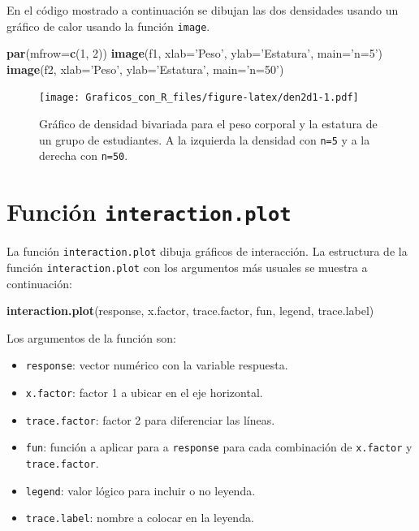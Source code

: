 \documentclass[10pt,]{krantz}
\makeatletter
\newenvironment{Shaded}{\begin{snugshade}}{\end{snugshade}}
\newcommand{\KeywordTok}[1]{\textcolor[rgb]{0.13,0.29,0.53}{\textbf{#1}}}
\newcommand{\DataTypeTok}[1]{\textcolor[rgb]{0.13,0.29,0.53}{#1}}
\newcommand{\DecValTok}[1]{\textcolor[rgb]{0.00,0.00,0.81}{#1}}
\newcommand{\StringTok}[1]{\textcolor[rgb]{0.31,0.60,0.02}{#1}}
\newcommand{\NormalTok}[1]{#1}
\providecommand{\tightlist}{%
  \setlength{\itemsep}{0pt}\setlength{\parskip}{0pt}}
\newenvironment{kframe}{%
\medskip{}
\setlength{\fboxsep}{.8em}
 \def\at@end@of@kframe{}%
 \ifinner\ifhmode%
  \def\at@end@of@kframe{\end{minipage}}%
  \begin{minipage}{\columnwidth}%
 \fi\fi%
 \def\FrameCommand##1{\hskip\@totalleftmargin \hskip-\fboxsep
 \colorbox{shadecolor}{##1}\hskip-\fboxsep
     \hskip-\linewidth \hskip-\@totalleftmargin \hskip\columnwidth}%
 \MakeFramed {\advance\hsize-\width
   \@totalleftmargin\z@ \linewidth\hsize
   \@setminipage}}%
 {\par\unskip\endMakeFramed%
 \at@end@of@kframe}
\renewenvironment{Shaded}{\begin{kframe}}{\end{kframe}}
\makeatother
\begin{document}
En el código mostrado a continuación se dibujan las dos densidades
usando un gráfico de calor usando la función \texttt{image}.

\begin{Shaded}
\begin{Highlighting}[]
\KeywordTok{par}\NormalTok{(}\DataTypeTok{mfrow=}\KeywordTok{c}\NormalTok{(}\DecValTok{1}\NormalTok{, }\DecValTok{2}\NormalTok{))}
\KeywordTok{image}\NormalTok{(f1, }\DataTypeTok{xlab=}\StringTok{'Peso'}\NormalTok{, }\DataTypeTok{ylab=}\StringTok{'Estatura'}\NormalTok{, }\DataTypeTok{main=}\StringTok{'n=5'}\NormalTok{)}
\KeywordTok{image}\NormalTok{(f2, }\DataTypeTok{xlab=}\StringTok{'Peso'}\NormalTok{, }\DataTypeTok{ylab=}\StringTok{'Estatura'}\NormalTok{, }\DataTypeTok{main=}\StringTok{'n=50'}\NormalTok{)}
\end{Highlighting}
\end{Shaded}

\begin{figure}
\centering
\texttt{[image: Graficos\_con\_R\_files/figure-latex/den2d1-1.pdf]}
\caption{\label{fig:den2d1}Gráfico de densidad bivariada para el peso
corporal y la estatura de un grupo de estudiantes. A la izquierda la
densidad con \texttt{n=5} y a la derecha con \texttt{n=50}.}
\end{figure}

\section{\texorpdfstring{Función \texttt{interaction.plot}
}{Función interaction.plot  }}\label{funcion-interaction.plot}

La función \texttt{interaction.plot} dibuja gráficos de interacción. La
estructura de la función \texttt{interaction.plot} con los argumentos
más usuales se muestra a continuación:

\begin{Shaded}
\begin{Highlighting}[]
\KeywordTok{interaction.plot}\NormalTok{(response, x.factor, trace.factor, fun,}
\NormalTok{                 legend, trace.label)}
\end{Highlighting}
\end{Shaded}

Los argumentos de la función son:

\begin{itemize}
\tightlist
\item
  \texttt{response}: vector numérico con la variable respuesta.
\item
  \texttt{x.factor}: factor 1 a ubicar en el eje horizontal.
\item
  \texttt{trace.factor}: factor 2 para diferenciar las líneas.
\item
  \texttt{fun}: función a aplicar para a \texttt{response} para cada
  combinación de \texttt{x.factor} y \texttt{trace.factor}.
\item
  \texttt{legend}: valor lógico para incluir o no leyenda.
\item
  \texttt{trace.label}: nombre a colocar en la leyenda.
\end{itemize}
\end{document}
